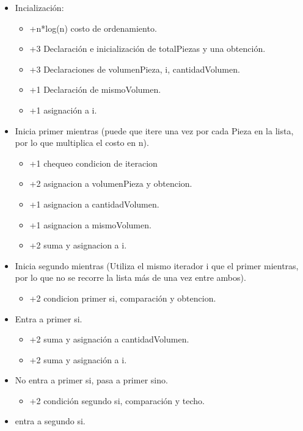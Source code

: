 \documentclass{article}
\begin{document}
\begin{itemize}
    \item Incialización:
    \begin{itemize}
        \item +n*log(n) costo de ordenamiento.
        \item +3 Declaración e inicialización de totalPiezas y una obtención.
        \item +3 Declaraciones de volumenPieza, i, cantidadVolumen.
        \item +1 Declaración de mismoVolumen.        
        \item +1 asignación a i.
    \end{itemize}
    \item Inicia primer mientras (puede que itere una vez por cada Pieza en la lista, por lo que multiplica el costo en n).
    \begin{itemize}
        \item +1 chequeo condicion de iteracion
        \item +2 asignacion a volumenPieza y obtencion.
        \item +1 asignacion a cantidadVolumen.
        \item +1 asignacion a mismoVolumen.
        \item +2 suma y asignacion a i.
    \end{itemize}
    \item Inicia segundo mientras (Utiliza el mismo iterador i que el primer mientras, por lo que no se recorre la lista más de una vez entre ambos).
    \begin{itemize}
        \item +2 condicion primer si, comparación y obtencion.
    \end{itemize}
    \item Entra a primer si.
    \begin{itemize}
        \item +2 suma y asignación a cantidadVolumen.
        \item +2 suma y asignación a i.        
    \end{itemize}
    \item No entra a primer si, pasa a primer sino.
    \begin{itemize}
        \item +2 condición segundo si, comparación y techo.
    \end{itemize}
    \item entra a segundo si.
    \begin{itemize}

\end{itemize}
\end{itemize}
\end{document}
